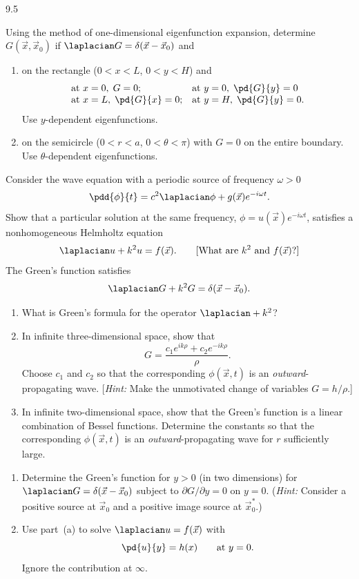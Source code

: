 \begin{exercises}{9.5}
\item Using the method of one-dimensional eigenfunction expansion, determine $G(\vec{x},\vec{x}_0)$ if $\laplacian G = \delta(\vec{x}-\vec{x}_0)$ and
\begin{enumerate}
\item[(a)] on the rectangle ($0 < x < L$, $0 < y < H$) and
\[
\begin{array}{ll}
\text{at } x=0,\; G=0; & \text{at } y=0,\; \pd{G}{y}=0 \\
\text{at } x=L,\; \pd{G}{x}=0; & \text{at } y=H,\; \pd{G}{y}=0.
\end{array}
\]
Use $y$-dependent eigenfunctions.
\item[\starred(b)] on the semicircle ($0 < r < a$, $0 < \theta < \pi$) with $G = 0$ on the entire boundary.  Use $\theta$-dependent eigenfunctions.
\end{enumerate}

\item[\starred 9.5.10.] Consider the wave equation with a periodic source of frequency $\omega > 0$
\[
\pdd{\phi}{t} = c^2\laplacian\phi + g(\vec{x})e^{-i\omega t}.
\]
Show that a particular solution at the same frequency, $\phi = u(\vec{x})e^{-i\omega t}$, satisfies a nonhomogeneous Helmholtz equation
\[
\laplacian u + k^2 u = f(\vec{x}). \qquad\text{[What are $k^2$ and $f(\vec{x})$?]}
\]
The Green's function satisfies
\[
\laplacian G + k^2 G = \delta(\vec{x}-\vec{x}_0).
\]
\begin{enumerate}
\item[(a)] What is Green's formula for the operator $\laplacian + k^2$?
\item[(b)] In infinite three-dimensional space, show that
\[
G = \frac{c_1 e^{ik\rho} + c_2 e^{-ik\rho}}{\rho}.
\]
Choose $c_1$ and $c_2$ so that the corresponding $\phi(\vec{x},t)$ is an \emph{outward}-propagating wave.  [\textit{Hint:} Make the unmotivated change of variables $G = h/\rho$.]
\item[(c)] In infinite two-dimensional space, show that the Green's function is a linear combination of Bessel functions.  Determine the constants so that the corresponding $\phi(\vec{x},t)$ is an \emph{outward}-propagating wave for $r$ sufficiently large.
\end{enumerate}

\item
\begin{enumerate}
\item[(a)] Determine the Green's function for $y > 0$ (in two dimensions) for $\laplacian G = \delta(\vec{x}-\vec{x}_0)$ subject to $\partial G/\partial y = 0$ on $y = 0$.  (\textit{Hint:} Consider a positive source at $\vec{x}_0$ and a positive image source at $\vec{x}_0^*$.)
\item[(b)] Use part~(a) to solve $\laplacian u = f(\vec{x})$ with
\[
\pd{u}{y} = h(x) \qquad\text{at } y = 0.
\]
Ignore the contribution at $\infty$.
\end{enumerate}


\end{exercises}
